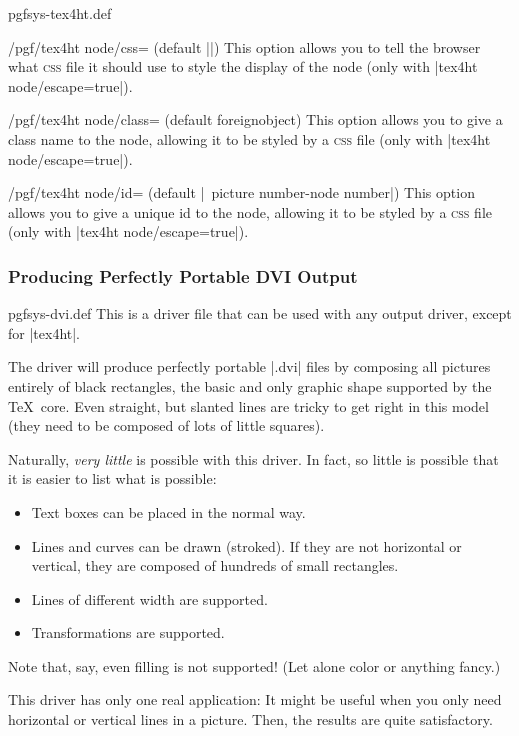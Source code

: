\begin{filedescription}{pgfsys-tex4ht.def}
    \begin{key}{/pgf/tex4ht node/css= (default |\string\jobname|)}
        This option allows you to tell the browser what \textsc{css} file it
        should  use to style the display of the node (only with 
        |tex4ht node/escape=true|).
    \end{key}

    \begin{key}{/pgf/tex4ht node/class= (default foreignobject)}
        This option allows you to give a class name to the node, allowing it to
        be styled by a \textsc{css} file (only with |tex4ht node/escape=true|).
    \end{key}

    \begin{key}{/pgf/tex4ht node/id= (default |\string\jobname\ picture number-node number|)}
        This option allows you to give a unique id to the node, allowing
        it to be styled by a \textsc{css} file (only with
        |tex4ht node/escape=true|).
    \end{key}
\end{filedescription}


\subsubsection{Producing Perfectly Portable DVI Output}

\begin{filedescription}{pgfsys-dvi.def}
    This is a driver file that can be used with any output driver, except for
    |tex4ht|.

    The driver will produce perfectly portable |.dvi| files by composing all
    pictures entirely of black rectangles, the basic and only graphic shape
    supported by the \TeX\ core. Even straight, but slanted lines are tricky to
    get right in this model (they need to be composed of lots of little
    squares).

    Naturally, \emph{very little} is possible with this driver. In fact, so
    little is possible that it is easier to list what is possible:
    \begin{itemize}
        \item Text boxes can be placed in the normal way.
        \item Lines and curves can be drawn (stroked). If they are not
            horizontal or vertical, they are composed of hundreds of small
            rectangles.
        \item Lines of different width are supported.
        \item Transformations are supported.
    \end{itemize}
    Note that, say, even filling is not supported! (Let alone color or anything
    fancy.)

    This driver has only one real application: It might be useful when you only
    need horizontal or vertical lines in a picture. Then, the results are quite
    satisfactory.
\end{filedescription}
